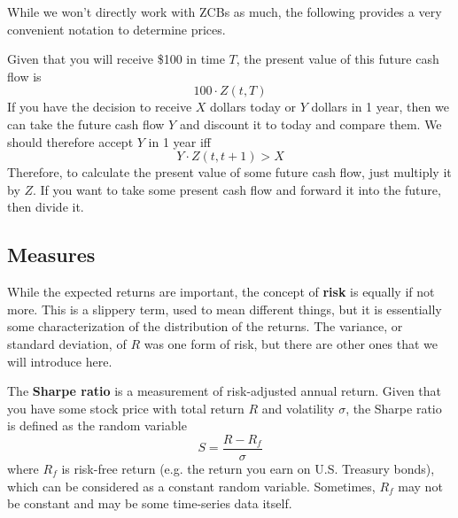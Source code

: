 \documentclass{article}
\begin{document}
    While we won't directly work with ZCBs as much, the following provides a very convenient notation to determine prices. 

    \begin{example}
      \label{ex:basic-zcb-application}
      Given that you will receive \$100 in time $T$, the present value of this future cash flow is 
      \begin{equation}
        100 \cdot Z(t, T)
      \end{equation}
      If you have the decision to receive $X$ dollars today or $Y$ dollars in 1 year, then we can take the future cash flow $Y$ and discount it to today and compare them. We should therefore accept $Y$ in 1 year iff 
      \begin{equation}
        Y \cdot Z(t, t + 1) > X  
      \end{equation}
      Therefore, to calculate the present value of some future cash flow, just multiply it by $Z$. If you want to take some present cash flow and forward it into the future, then divide it. 
    \end{example}

  \subsection{Measures}

    While the expected returns are important, the concept of \textbf{risk} is equally if not more. This is a slippery term, used to mean different things, but it is essentially some characterization of the distribution of the returns. The variance, or standard deviation, of $R$ was one form of risk, but there are other ones that we will introduce here. 

    \begin{definition}
      \label{def:sharpe-ratio}
      The \textbf{Sharpe ratio} is a measurement of risk-adjusted annual return. Given that you have some stock price with total return $R$ and volatility $\sigma$, the Sharpe ratio is defined as the random variable
      \begin{equation}
        S = \frac{R - R_f}{\sigma}
      \end{equation}
      where $R_f$ is risk-free return (e.g. the return you earn on U.S. Treasury bonds), which can be considered as a constant random variable. Sometimes, $R_f$ may not be constant and may be some time-series data itself. 
    \end{definition}
\end{document}
